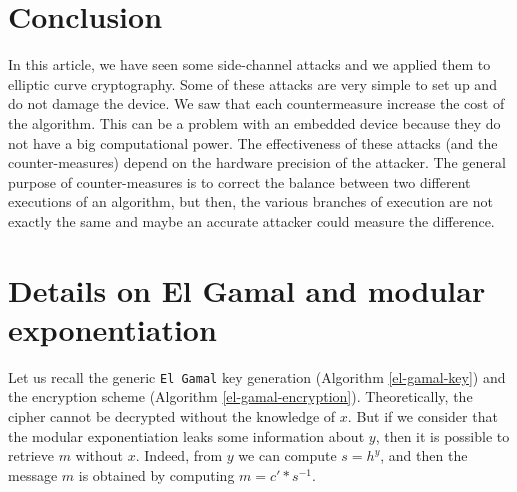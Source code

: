 \documentclass[journal]{IEEEtran}
\begin{document}
\section{Conclusion}

In this article, we have seen some side-channel attacks and we applied them to elliptic curve cryptography. Some of these attacks are very simple to set up and do not damage the device. We saw that each countermeasure increase the cost of the algorithm. This can be a problem with an embedded device because they do not have a big computational power. The effectiveness of these attacks (and the counter-measures) depend on the hardware precision of the attacker. The general purpose of counter-measures is to correct the balance between two different executions of an algorithm, but then, the various branches of execution are not exactly the same and maybe an accurate attacker could measure the difference.

\clearpage




%


\appendices
\section{Details on El Gamal and modular exponentiation}
\label{ElGamal}
Let us recall the generic {\tt El Gamal} key generation (Algorithm \ref{el-gamal-key})
and the encryption scheme (Algorithm \ref{el-gamal-encryption}).
Theoretically, the cipher cannot be decrypted without the knowledge of $x$. But if we consider that
the modular exponentiation leaks some information about $y$, then it is possible to retrieve $m$ without $x$.
Indeed, from $y$ we can compute $s = h^y$, and then the message $m$ is obtained by computing $m = c' * s^{-1}$.
\end{document}

